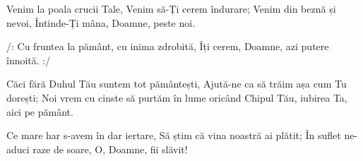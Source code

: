 \beginverse
Venim la poala crucii Tale,
Venim să-Ți cerem îndurare;
Venim din beznă și nevoi,
Întinde-Ți mâna, Doamne, peste noi.
\endverse

\beginchorus
/: Cu fruntea la pământ, cu inima zdrobită,
Îți cerem, Doamne, azi putere înnoită. :/
\endchorus

\beginverse
Căci fără Duhul Tău suntem tot pământești,
Ajută-ne ca să trăim așa cum Tu dorești;
Noi vrem cu cinste să purtăm în lume oricând
Chipul Tău, iubirea Ta, aici pe pământ.
\endverse

\beginverse
Ce mare har s-avem în dar iertare,
Să știm că vina noastră ai plătit;
În suflet ne-aduci raze de soare,
O, Doamne, fii slăvit!
\endverse
\endsong